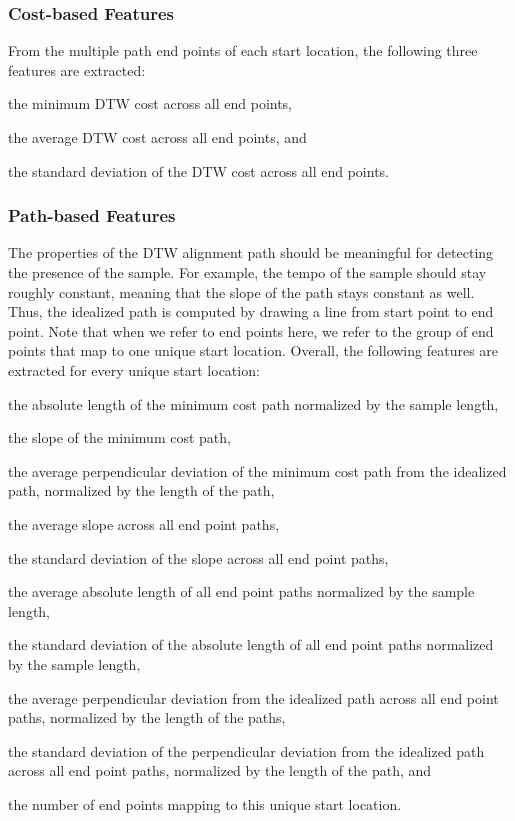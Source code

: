\documentclass{article}
\begin{document}
\subsubsection{Cost-based Features}
From the multiple path end points of each start location, the following three features are extracted: 
\begin{inparaenum}[(i)]
    \item   the minimum DTW cost across all end points,
    \item   the average DTW cost across all end points, and
    \item   the standard deviation of the DTW cost across all end points.
\end{inparaenum}

\subsubsection{Path-based Features}
The properties of the DTW alignment path should be meaningful for detecting the presence of the sample.  For example, the tempo of the sample should stay roughly constant, meaning that the slope of the path stays constant as well. Thus, the idealized path is computed by drawing a line from start point to end point. Note that when we refer to end points here, we refer to the group of end points that map to one  unique start location.
Overall, the following features are extracted for every unique start location: 
\begin{inparaenum}[(i)]
    \item   the absolute length of the minimum cost path normalized by the sample length,
    \item   the slope of the minimum cost path, 
    \item   the average perpendicular deviation of the minimum cost path from the idealized path, normalized by the length of the path,
    \item   the average slope across all end point paths, 
		\item   the standard deviation of the slope across all end point paths, 
    \item   the average absolute length of all end point paths normalized by the sample length,
		\item   the standard deviation of the absolute length of all end point paths normalized by the sample length,
    \item   the average perpendicular deviation from the idealized path across all end point paths, normalized by the length of the paths,
    \item   the standard deviation of the perpendicular deviation from the idealized path across all end point paths, normalized by the length of the path, and
    \item   the number of end points mapping to this unique start location.
\end{inparaenum}
\end{document}
